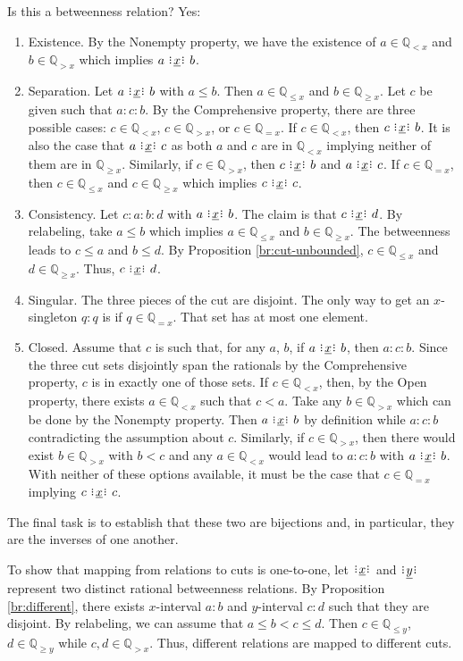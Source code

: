 \documentclass[12pt]{article}
\newcommand{\qcut}[2][x]{\ensuremath{\mathbb{Q}_{#2 #1}}}
\newcommand{\qlt}[1][x]{\qcut[#1]{<}}
\newcommand{\qeq}[1][x]{\qcut[#1]{=}}
\newcommand{\qgt}[1][x]{\qcut[#1]{>}}
\newcommand{\qgeq}[1][x]{\qcut[#1]{\geq}}
\newcommand{\qleq}[1][x]{\qcut[#1]{\leq}}
\newcommand{\yrel}{\xrel[y]}
\begin{document}
Is this a betweenness relation? Yes: 
\begin{enumerate}
    \item Existence. By the Nonempty property, we have the existence of $a \in \qlt$ and $b \in \qgt$ which implies $a \xrel b$. 
    \item Separation. Let $a \xrel b$ with $a \leq b$.  Then $a \in \qleq$ and $b \in \qgeq$. Let $c$ be given such that $a:c:b$. By the Comprehensive property, there are three possible cases: $c \in \qlt$, $c \in \qgt$, or $c \in \qeq$. If $c \in \qlt$, then  $c \xrel b$. It is also the case that \sout{$a \xrel c$} as both $a$ and $c$ are in $\qlt$ implying neither of them are in $\qgeq$. Similarly, if $c \in \qgt$, then \sout{$c \xrel b$} and $a \xrel c$. If $c \in \qeq$, then $c \in \qleq$ and $c \in \qgeq$ which implies $c \xrel c$. 
    \item Consistency. Let $c:a:b:d$ with $ a \xrel b$. The claim is that $c \xrel d$. By relabeling, take $a \leq b$ which implies $a \in \qleq$ and $b \in \qgeq$.  The betweenness leads to $c \leq a$ and $ b \leq d$. By Proposition \ref{br:cut-unbounded},  $c \in \qleq$ and $ d \in \qgeq$. Thus, $c \xrel d$.
    \item Singular. The three pieces of the cut are disjoint. The only way to get an $x$-singleton $q:q$ is if $q \in \qeq$. That set has at most one element. 
    \item Closed. Assume that $c$ is such that, for any $a$, $b$, if $a \xrel b$, then $a:c:b$. Since the three cut sets disjointly span the rationals by the Comprehensive property, $c$ is in exactly one of those sets. If $c \in \qlt$, then, by the Open property, there exists $a \in \qlt$ such that $c < a$. Take any $b \in \qgt$ which can be done by the Nonempty property. Then $a \xrel b$ by definition while \sout{$a:c:b$} contradicting the assumption about $c$. Similarly, if $c \in \qgt$, then there would exist $b \in \qgt$ with $b < c$ and any $a \in \qlt$ would lead to \sout{$a:c:b$} with $a \xrel b$. With neither of these options available, it must be the case that $c \in \qeq$ implying $c \xrel c$.    
\end{enumerate}

The final task is to establish that these two are bijections and, in particular, they are the inverses of one another. 

To show that mapping from relations to cuts is one-to-one, let $\xrel$ and $\yrel$ represent two distinct rational betweenness relations. By Proposition \ref{br:different}, there exists $x$-interval $a:b$ and $y$-interval $c:d$ such that they are disjoint. By relabeling, we can assume that $a \leq b < c \leq d$. Then $c \in \qleq[y]$, $d \in \qgeq[y]$ while $c, d \in \qgt[x]$. Thus, different relations are mapped to different cuts. 
\end{document}
